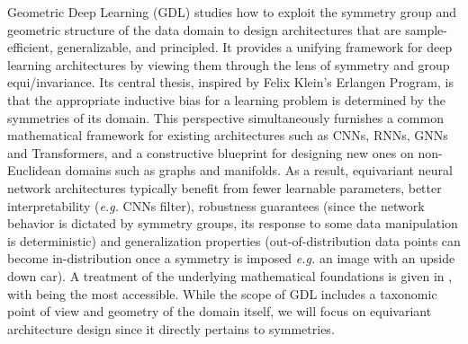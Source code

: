 \documentclass[mathematics,review,submit,moreauthors]{Definitions/mdpi}
\begin{document}

Geometric Deep Learning (GDL) \citep{bronstein2017ispm,bronstein2021} studies how to exploit the symmetry group and geometric structure of the data domain to design architectures that are sample-efficient, generalizable, and principled.
It provides a unifying framework for deep learning architectures by viewing them through the lens of symmetry and group equi\slash invariance.
Its central thesis, inspired by Felix Klein's Erlangen Program, is that the appropriate inductive bias for a learning problem is determined by the symmetries of its domain.
This perspective simultaneously furnishes a common mathematical framework for existing architectures such as CNNs, RNNs, GNNs and Transformers, and a constructive blueprint for designing new ones on non-Euclidean domains such as graphs and manifolds.
As a result, equivariant neural network architectures typically benefit from fewer learnable parameters, better interpretability (\textit{e.g.} CNNs filter), robustness guarantees (since the network behavior is dictated by symmetry groups, its response to some data manipulation is deterministic) and generalization properties (out-of-distribution data points can become in-distribution once a symmetry is imposed \textit{e.g.} an image with an upside down car).
A treatment of the underlying mathematical foundations is given in \cite{borde2025,gerken2021,carlsson}, with \cite{borde2025} being the most accessible.
While the scope of GDL includes a taxonomic point of view and geometry of the domain itself, we will focus on equivariant architecture design since it directly pertains to symmetries.
\end{document}
